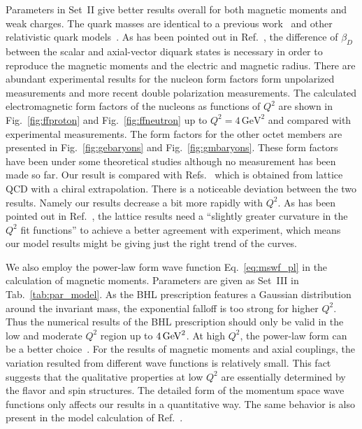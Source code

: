 \documentclass[aps,prc,preprint,groupedaddress,showpacs,superscriptaddress,floatfix]{revtex4-1}
\newcommand{\GeV}{\ensuremath\mathrm{GeV}}
\begin{document}
Parameters in Set~II give  better results overall for both magnetic moments and weak charges.
The quark masses are identical to a previous work~\cite{ma_electromagnetic_2002} and other relativistic quark models~\cite{schlumpf_relativistic_1994}.
As has been pointed out in Ref.~\cite{ma_electromagnetic_2002}, the difference of $\beta_D$ between the scalar and axial-vector diquark states is necessary in order to reproduce the magnetic moments and the electric and magnetic radius.
There are abundant experimental results for the nucleon form factors form unpolarized measurements and more recent double polarization measurements.
The calculated electromagnetic form factors of the nucleons as functions of $Q^2$ are shown in Fig.~\ref{fig:ffproton} and Fig.~\ref{fig:ffneutron} up to $Q^2=4\,\mathrm{GeV}^2$ and compared with experimental measurements.
The form factors for the other octet members are presented in Fig.~\ref{fig:gebaryons} and Fig.~\ref{fig:gmbaryons}.
These form factors have been under some theoretical studies although no measurement has been made so far.
Our result is compared with Refs.~\cite{shanahan_magnetic_2014, shanahan_electric_2014} which is obtained from lattice QCD with a chiral extrapolation.
There is a noticeable deviation between the two results. 
Namely our results decrease a bit more rapidly with $Q^2$.
As has been pointed out in Ref.~\cite{shanahan_magnetic_2014}, the lattice results need a ``slightly greater curvature in the $Q^2$ fit functions'' to achieve a better agreement with experiment, which means our model results might be giving just the right trend of the curves.

We also employ the power-law form wave function Eq.~\eqref{eq:mswf_pl} in the calculation of magnetic moments.
Parameters are given as Set~III in Tab.~\ref{tab:par_model}.
As the BHL prescription features a Gaussian distribution around the invariant mass, the exponential falloff is too strong for higher $Q^2$.
Thus the numerical results of the BHL prescription should only be valid in the low and moderate $Q^2$ region up to $4\,\GeV^2$.
At high $Q^2$, the power-law form can be a better choice~\cite{brodsky_wave_1994}.
For the results of magnetic moments and axial couplings, the variation resulted from different wave functions is relatively small.
This fact suggests that the qualitative properties at low $Q^2$ are essentially determined by the flavor and spin structures.
The detailed form of the momentum space wave functions only affects our results in a quantitative way.
The same behavior is also present in the model calculation of Ref.~\cite{schlumpf_relativistic_1994}.
\end{document}
